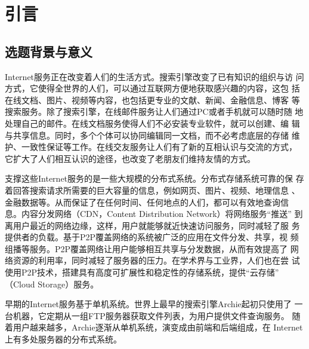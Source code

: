 \chapter{引言}
\label{chap:intro}

\section{选题背景与意义}




Internet服务正在改变着人们的生活方式。搜索引擎改变了已有知识的组织与访
问方式，它使得全世界的人们，可以通过互联网方便地获取感兴趣的内容，这包
括在线文档、图片、视频等内容，也包括更专业的文献、新闻、金融信息、博客
等搜索服务。除了搜索引擎，在线邮件服务让人们通过PC或者手机就可以随时随
地处理自己的邮件。在线文档服务使得人们不必安装专业软件，就可以创建、编
辑与共享信息。同时，多个个体可以协同编辑同一文档，而不必考虑底层的存储
维护、一致性保证等工作。在线交友服务让人们有了新的互相认识与交流的方式，
它扩大了人们相互认识的途径，也改变了老朋友们维持友情的方式。


支撑这些Internet服务的是一些大规模的分布式系统。分布式存储系统可靠的保
存着回答搜索请求所需要的巨大容量的信息，例如网页、图片、视频、地理信息
、金融数据等。从而保证了在任何时间、任何地点的人们，都可以有效地查询信
息。内容分发网络（CDN，Content Distribution Network）将网络服务“推送”
到离用户最近的网络边缘，这样，用户就能够就近快速访问服务，同时减轻了服
务提供者的负载。基于P2P覆盖网络的系统被广泛的应用在文件分发、共享，视
频组播等服务。P2P覆盖网络让用户能够相互共享与分发数据，从而有效提高了
网络资源的利用率，同时减轻了服务器的压力。在学术界与工业界，人们也在尝
试使用P2P技术，搭建具有高度可扩展性和稳定性的存储系统，提供“云存储”
（Cloud Storage）服务。

早期的Internet服务基于单机系统。世界上最早的搜索引擎Archie起初只使用了
一台机器，它定期从一组FTP服务器获取文件列表，为用户提供文件查询服务。
随着用户越来越多，Archie逐渐从单机系统，演变成由前端和后端组成，在
Internet上有多处服务器的分布式系统。

